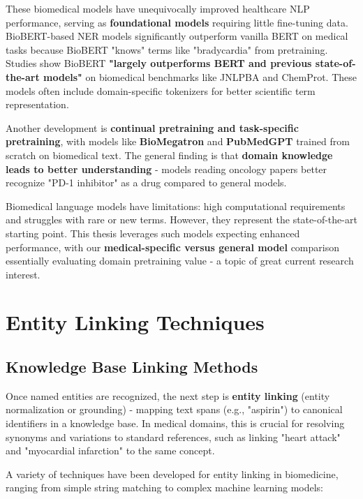 These biomedical models have unequivocally improved healthcare NLP performance, serving as \textbf{foundational models} requiring little fine-tuning data. BioBERT-based NER models significantly outperform vanilla BERT on medical tasks because BioBERT "knows" terms like "bradycardia" from pretraining. Studies show BioBERT \textbf{"largely outperforms BERT and previous state-of-the-art models"} on biomedical benchmarks like JNLPBA and ChemProt. These models often include domain-specific tokenizers for better scientific term representation.

Another development is \textbf{continual pretraining and task-specific pretraining}, with models like \textbf{BioMegatron} and \textbf{PubMedGPT} trained from scratch on biomedical text. The general finding is that \textbf{domain knowledge leads to better understanding} - models reading oncology papers better recognize "PD-1 inhibitor" as a drug compared to general models.

Biomedical language models have limitations: high computational requirements and struggles with rare or new terms. However, they represent the state-of-the-art starting point. This thesis leverages such models expecting enhanced performance, with our \textbf{medical-specific versus general model} comparison essentially evaluating domain pretraining value - a topic of great current research interest.

\section{Entity Linking Techniques}

\subsection{Knowledge Base Linking Methods}

Once named entities are recognized, the next step is \textbf{entity linking} (entity normalization or grounding) - mapping text spans (e.g., "aspirin") to canonical identifiers in a knowledge base. In medical domains, this is crucial for resolving synonyms and variations to standard references, such as linking "heart attack" and "myocardial infarction" to the same concept.

A variety of techniques have been developed for entity linking in biomedicine, ranging from simple string matching to complex machine learning models:

